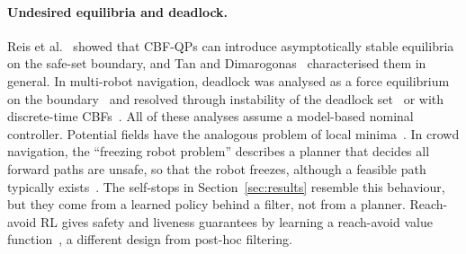 \documentclass[11pt]{article}
\theoremstyle{definition}
\theoremstyle{remark}
\begin{document}
\paragraph{Undesired equilibria and deadlock.} Reis et al.~\cite{reis2021undesired} showed that CBF-QPs can introduce asymptotically stable equilibria on the safe-set boundary, and Tan and Dimarogonas~\cite{tan2024undesired} characterised them in general. In multi-robot navigation, deadlock was analysed as a force equilibrium on the boundary~\cite{grover2021deadlock,grover2023deadlock} and resolved through instability of the deadlock set~\cite{jankovic2024liveness} or with discrete-time CBFs~\cite{chandra2025deadlock}. All of these analyses assume a model-based nominal controller. Potential fields have the analogous problem of local minima~\cite{koren1991potential}. In crowd navigation, the ``freezing robot problem'' describes a planner that decides all forward paths are unsafe, so that the robot freezes, although a feasible path typically exists~\cite{trautman2010unfreezing}. The self-stops in Section~\ref{sec:results} resemble this behaviour, but they come from a learned policy behind a filter, not from a planner. Reach-avoid RL gives safety and liveness guarantees by learning a reach-avoid value function~\cite{hsu2021reachavoid}, a different design from post-hoc filtering.
\end{document}
